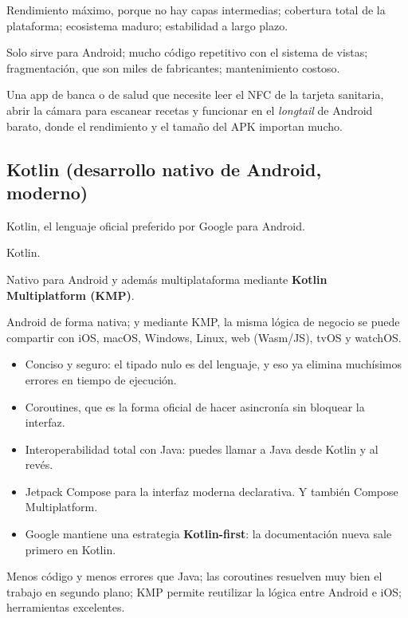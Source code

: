  Rendimiento máximo, porque no hay capas intermedias; cobertura total de la plataforma; ecosistema maduro; estabilidad a largo plazo.

 Solo sirve para Android; mucho código repetitivo con el sistema de vistas; fragmentación, que son miles de fabricantes; mantenimiento costoso.

 Una app de banca o de salud que necesite leer el NFC de la tarjeta sanitaria, abrir la cámara para escanear recetas y funcionar en el \emph{longtail} de Android barato, donde el rendimiento y el tamaño del APK importan mucho.

\subsection{Kotlin (desarrollo nativo de Android, moderno)}

 Kotlin, el lenguaje oficial preferido por Google para Android.

 Kotlin.

 Nativo para Android y además multiplataforma mediante \textbf{Kotlin Multiplatform (KMP)}.

 Android de forma nativa; y mediante KMP, la misma lógica de negocio se puede compartir con iOS, macOS, Windows, Linux, web (Wasm/JS), tvOS y watchOS.

\begin{itemize}[leftmargin=*,itemsep=0.2em,topsep=0.2em]
  \item Conciso y seguro: el tipado nulo es del lenguaje, y eso ya elimina muchísimos errores en tiempo de ejecución.
  \item Coroutines, que es la forma oficial de hacer asincronía sin bloquear la interfaz.
  \item Interoperabilidad total con Java: puedes llamar a Java desde Kotlin y al revés.
  \item Jetpack Compose para la interfaz moderna declarativa. Y también Compose Multiplatform.
  \item Google mantiene una estrategia \textbf{Kotlin-first}: la documentación nueva sale primero en Kotlin.
\end{itemize}

 Menos código y menos errores que Java; las coroutines resuelven muy bien el trabajo en segundo plano; KMP permite reutilizar la lógica entre Android e iOS; herramientas excelentes.

